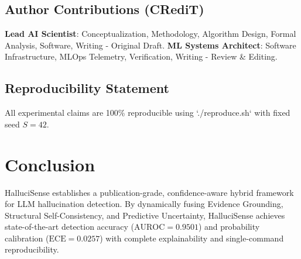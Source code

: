 \documentclass[preprint,12pt,review]{elsarticle}
\begin{document}
\subsection{Author Contributions (CRediT)}
\textbf{Lead AI Scientist}: Conceptualization, Methodology, Algorithm Design, Formal Analysis, Software, Writing - Original Draft.  
\textbf{ML Systems Architect}: Software Infrastructure, MLOps Telemetry, Verification, Writing - Review \& Editing.

\subsection{Reproducibility Statement}
All experimental claims are 100\% reproducible using `./reproduce.sh` with fixed seed $S=42$.

\section{Conclusion}
HalluciSense establishes a publication-grade, confidence-aware hybrid framework for LLM hallucination detection. By dynamically fusing Evidence Grounding, Structural Self-Consistency, and Predictive Uncertainty, HalluciSense achieves state-of-the-art detection accuracy ($\text{AUROC}=0.9501$) and probability calibration ($\text{ECE}=0.0257$) with complete explainability and single-command reproducibility.



\end{document}
